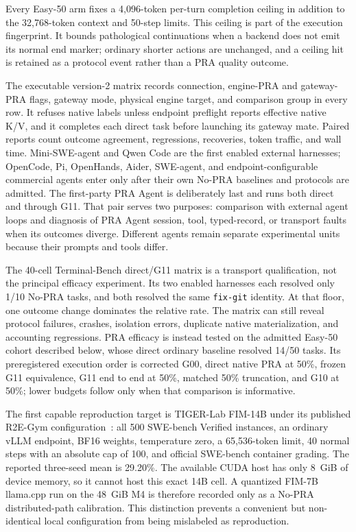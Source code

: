 \documentclass[11pt]{article}
\begin{document}
Every Easy-50 arm fixes a 4,096-token per-turn completion ceiling in addition
to the 32,768-token context and 50-step limits. This ceiling is part of the
execution fingerprint. It bounds pathological continuations when a backend
does not emit its normal end marker; ordinary shorter actions are unchanged,
and a ceiling hit is retained as a protocol event rather than a PRA quality
outcome.

The executable version-2 matrix records connection, engine-PRA and gateway-PRA
flags, gateway mode, physical engine target, and comparison group in every row.
It refuses native labels unless endpoint preflight reports effective native
K/V, and it completes each direct task before launching its gateway mate.
Paired reports count outcome agreement, regressions, recoveries, token traffic,
and wall time. Mini-SWE-agent and Qwen Code are the first enabled external
harnesses; OpenCode, Pi, OpenHands, Aider, SWE-agent, and endpoint-configurable
commercial agents enter only after their own No-PRA baselines and protocols are
admitted. The first-party PRA Agent is deliberately last and runs both direct
and through G11. That pair serves two purposes: comparison with external agent
loops and diagnosis of PRA Agent session, tool, typed-record, or transport
faults when its outcomes diverge. Different agents remain separate experimental
units because their prompts and tools differ.

The 40-cell Terminal-Bench direct/G11 matrix is a transport qualification,
not the principal efficacy experiment. Its two enabled harnesses each resolved
only 1/10 No-PRA tasks, and both resolved the same \texttt{fix-git} identity.
At that floor, one outcome change dominates the relative rate. The matrix can
still reveal protocol failures, crashes, isolation errors, duplicate native
materialization, and accounting regressions. PRA efficacy is instead tested on
the admitted Easy-50 cohort described below, whose direct ordinary baseline
resolved 14/50 tasks. Its preregistered execution order is corrected G00,
direct native PRA at 50\%, frozen G11 equivalence, G11 end to end at 50\%,
matched 50\% truncation, and G10 at 50\%; lower budgets follow only when that
comparison is informative.

The first capable reproduction target is TIGER-Lab FIM-14B under its published
R2E-Gym configuration~\cite{wang2026fim,jain2025r2egym}: all 500 SWE-bench
Verified instances, an ordinary vLLM endpoint, BF16 weights, temperature zero,
a 65,536-token limit, 40 normal steps with an absolute cap of 100, and official
SWE-bench container grading. The
reported three-seed mean is 29.20\%. The available CUDA host has only 8~GiB of
device memory, so it cannot host this exact 14B cell. A quantized FIM-7B
llama.cpp run on the 48~GiB M4 is therefore recorded only as a No-PRA
distributed-path calibration. This distinction prevents a convenient but
non-identical local configuration from being mislabeled as reproduction.
\end{document}
